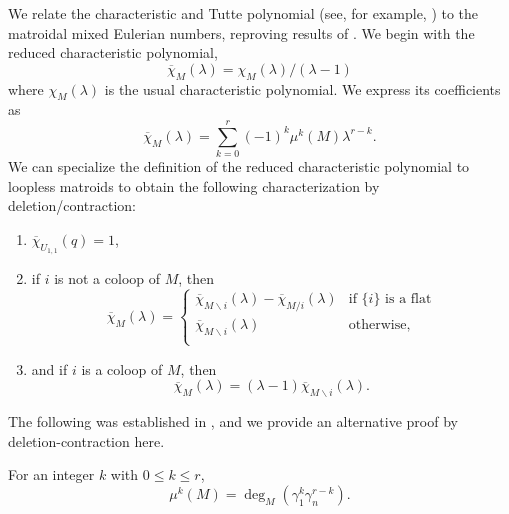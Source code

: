 \documentclass[ALCO,published]{cedram}
\numberwithin{equation}{section}
\numberwithin{figure}{section}
\begin{document}
We relate the characteristic and Tutte polynomial (see, for example, \cite{BO:Tutte}) to the matroidal mixed Eulerian numbers, reproving results of \cite{HuhKatz,BST}. 
We begin with the reduced characteristic polynomial,
\[\overline{\chi}_M(\lambda)=\chi_M(\lambda)/(\lambda-1)\]
where $\chi_M(\lambda)$ is the usual characteristic polynomial. 
We express its coefficients as
  \[\overline{\chi}_M(\lambda)=\sum_{k=0}^r(-1)^k\mu^k(M)\lambda^{r-k}.\]
We can specialize the definition of the reduced characteristic polynomial to loopless matroids to obtain the following characterization by deletion/contraction:
\begin{enumerate}
    \item $\overline{\chi}_{U_{1,1}}(q)=1$,
    \item if $i$ is not a coloop of $M$, then
    \[\overline{\chi}_M(\lambda)=
    \begin{cases}
     \overline{\chi}_{M\backslash i}(\lambda)-\overline{\chi}_{M/i}(\lambda) &\text{if $\{i\}$ is a flat}\\
     \overline{\chi}_{M\backslash i}(\lambda) &\text{otherwise},\\
    \end{cases}\]
    \item and if $i$ is a coloop of $M$, then 
    \[\overline{\chi}_M(\lambda)=(\lambda-1)\overline{\chi}_{M\backslash i}(\lambda).\]    
\end{enumerate}

The following was established in \cite{HuhKatz}, and we provide an alternative proof by deletion-contraction here.
\begin{prop} \label{p:charpoly} For an integer $k$ with $0\leq k\leq r$,
\[\mu^k(M)=\deg_M(\gamma_1^k\gamma_n^{r-k}).\]
\end{prop}
\end{document}

